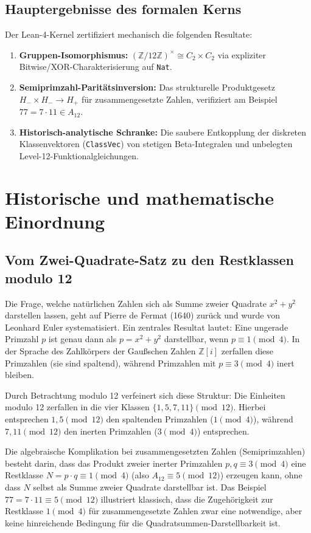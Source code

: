 \documentclass[11pt,a4paper]{article}
\theoremstyle{definition}
\begin{document}
	\subsection{Hauptergebnisse des formalen Kerns}
	Der Lean-4-Kernel zertifiziert mechanisch die folgenden Resultate:
	\begin{enumerate}
		\item \textbf{Gruppen-Isomorphismus:} $(\mathbb{Z}/12\mathbb{Z})^\times \cong C_2 \times C_2$ via expliziter Bitwise/XOR-Charakterisierung auf \texttt{Nat}.
		\item \textbf{Semiprimzahl-Paritätsinversion:} Das strukturelle Produktgesetz $H_- \times H_- \to H_+$ für zusammengesetzte Zahlen, verifiziert am Beispiel $77 = 7 \cdot 11 \in A_{12}$.
		\item \textbf{Historisch-analytische Schranke:} Die saubere Entkopplung der diskreten Klassenvektoren (\texttt{ClassVec}) von stetigen Beta-Integralen und unbelegten Level-12-Funktionalgleichungen.
	\end{enumerate}
	
	\section{Historische und mathematische Einordnung}
	
	\subsection{Vom Zwei-Quadrate-Satz zu den Restklassen modulo 12}
	Die Frage, welche natürlichen Zahlen sich als Summe zweier Quadrate $x^2 + y^2$ darstellen lassen, geht auf Pierre de Fermat (1640) zurück und wurde von Leonhard Euler systematisiert. Ein zentrales Resultat lautet: Eine ungerade Primzahl $p$ ist genau dann als $p = x^2 + y^2$ darstellbar, wenn $p \equiv 1 \pmod 4$. In der Sprache des Zahlkörpers der Gaußschen Zahlen $\mathbb{Z}[i]$ zerfallen diese Primzahlen (sie sind spaltend), während Primzahlen mit $p \equiv 3 \pmod 4$ inert bleiben.
	
	Durch Betrachtung modulo 12 verfeinert sich diese Struktur:
	Die Einheiten modulo 12 zerfallen in die vier Klassen $\{1, 5, 7, 11\} \pmod{12}$.
	Hierbei entsprechen $1, 5 \pmod{12}$ den spaltenden Primzahlen ($1 \pmod 4$), während $7, 11 \pmod{12}$ den inerten Primzahlen ($3 \pmod 4$) entsprechen. 
	
	Die algebraische Komplikation bei zusammengesetzten Zahlen (Semiprimzahlen) besteht darin, dass das Produkt zweier inerter Primzahlen $p, q \equiv 3 \pmod 4$ eine Restklasse $N = p \cdot q \equiv 1 \pmod 4$ (also $A_{12} \equiv 5 \pmod{12}$) erzeugen kann, ohne dass $N$ selbst als Summe zweier Quadrate darstellbar ist. Das Beispiel $77 = 7 \cdot 11 \equiv 5 \pmod{12}$ illustriert klassisch, dass die Zugehörigkeit zur Restklasse $1 \pmod 4$ für zusammengesetzte Zahlen zwar eine notwendige, aber keine hinreichende Bedingung für die Quadratsummen-Darstellbarkeit ist.
	
\end{document}
